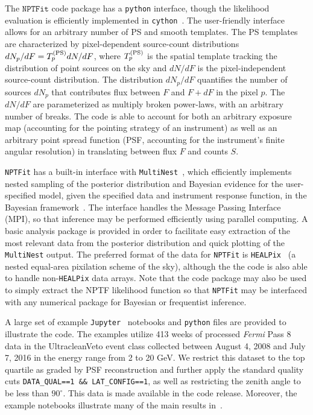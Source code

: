 The $\texttt{NPTFit}$ code package has a \texttt{python} interface, though the likelihood evaluation is efficiently implemented in \texttt{cython}~\cite{behnel2010cython}.  The user-friendly interface allows for an arbitrary number of PS and smooth templates.  The PS templates are characterized by pixel-dependent source-count distributions $dN_p/dF = T_p^{({\rm PS})} dN/dF$, where $T_p^{({\rm PS})}$ is the spatial template tracking the distribution of point sources on the sky and $dN/dF$ is the pixel-independent source-count distribution.  The distribution $dN_p/dF$ quantifies the number of sources $dN_p$ that contributes flux between $F$ and $F + dF$ in the pixel $p$.  The $dN/dF$ are parameterized as multiply broken power-laws, with an arbitrary number of breaks.  The code is able to account for both an arbitrary exposure map (accounting for the pointing strategy of an instrument) as well as an arbitrary point spread function (PSF, accounting for the instrument's finite angular resolution) in translating between flux $F$ and counts $S$. 

 \texttt{NPTFit} has a built-in interface with \texttt{MultiNest}~\cite{Feroz:2008xx,Buchner:2014nha}, which efficiently implements nested sampling of the posterior distribution and Bayesian evidence for the user-specified model, given the specified data and instrument response function, in the Bayesian framework~\cite{Feroz:2013hea,Feroz:2007kg,skilling2006}.  The interface handles the Message Passing Interface (MPI), so that inference may be performed efficiently using parallel computing.  A basic analysis package is provided in order to facilitate easy extraction of the most relevant data from the posterior distribution and quick plotting of the \texttt{MultiNest} output.  The preferred format of the data for \texttt{NPTFit} is \texttt{HEALPix}~\cite{Gorski:2004by} (a nested equal-area pixilation scheme of the sky), although the the code is also able to handle non-\texttt{HEALPix} data arrays. Note that the code package may also be used to simply extract the NPTF likelihood function so that \texttt{NPTFit} may be interfaced with any numerical package for Bayesian or frequentist inference.

A large set of example \texttt{Jupyter}~\cite{PER-GRA:2007} notebooks and \texttt{python} files are provided to illustrate the code.  The examples utilize 413 weeks of processed \emph{Fermi} Pass 8 data in the UltracleanVeto event class collected between August 4, 2008 and July 7, 2016 in the energy range from 2 to 20 GeV. We restrict this dataset to the top quartile as graded by PSF reconstruction and further apply the standard quality cuts \texttt{DATA\_QUAL==1 \&\& LAT\_CONFIG==1}, as well as restricting the zenith angle to be less than $90^\circ$. This data is made available in the code release.  Moreover, the example notebooks illustrate many of the main results in~\cite{Lee:2015fea,Linden:2016rcf,Lisanti:2016jub}.

